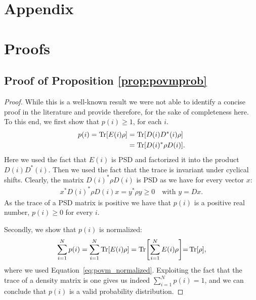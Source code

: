 \section*{\LARGE Appendix}

\section{Proofs}


\subsection{Proof of Proposition \ref{prop:povmprob}}
\label{sec:proof:prop:povmprob}

\proppovmprob*

\begin{proof}
	While this is a well-known result we were not able to identify a concise proof in the literature and provide therefore, for the sake of completeness here. To this end, we
	first show that $p(i)\geq 1$, for each $i$.
	\begin{align}
		p(i)
		=
		\Tr [ E(i) \rho ]
		 &
		=
		\Tr [ D(i) D^*(i)  \rho ]
		\\
		 &
		=
		\Tr [ D(i)^*  \rho D(i) ]. \nonumber
	\end{align}
	Here we used the fact that $E(i)$ is PSD and factorized it into the product $D(i) D^*(i)$. Then we used the fact that the trace is invariant under cyclical shifts.
	Clearly, the matrix $ D(i)^*  \rho D(i)$ is PSD as we have for every vector $x$:
	\begin{align}
		x^* D(i)^*  \rho D(i) x = y^* \rho y \geq 0 \quad \text{with } y = Dx.
		\label{eq:def:psdPOVM}
	\end{align}
	As the trace of a PSD matrix is positive we have that $p(i)$ is a positive real number, \ie $p(i){\geq} 0$ for every $i$.

	Secondly, we show that $p(i)$ is normalized:
	\begin{align}
		\sum_{i=1}^N p(i)
		=
		\sum_{i=1}^N \Tr [ E(i) \rho ]
		=
		\Tr [ \sum_{i=1}^N E(i) \rho ]
		{=}
		\Tr [  \rho ],
	\end{align}
	where we used Equation~\ref{eq:povm_normalized}.
	Exploiting the fact that the trace of a density matrix is one gives us indeed $\sum_{i=1}^N p(i)=1$, and we can conclude that $p(i)$ is a valid probability distribution.
\end{proof}




